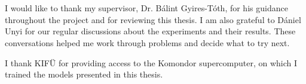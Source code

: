 \chapter*{\koszonetnyilvanitas}

I would like to thank my supervisor, Dr. Bálint Gyires-Tóth, for his guidance throughout the project and for reviewing this thesis. I am also grateful to Dániel Unyi for our regular discussions about the experiments and their results. These conversations helped me work through problems and decide what to try next.

I thank KIFÜ for providing access to the Komondor supercomputer, on which I trained the models presented in this thesis.
